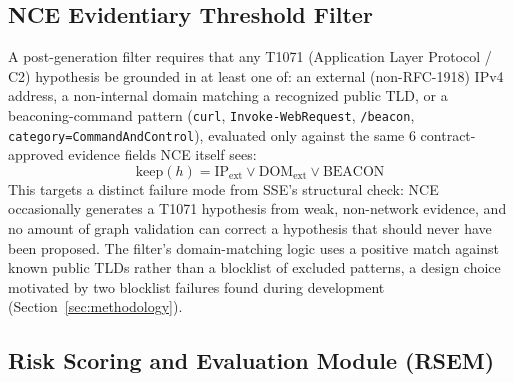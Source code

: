 \documentclass[conference]{IEEEtran}
\begin{document}
\subsection{NCE Evidentiary Threshold Filter}
\label{sec:filter}

A post-generation filter requires that any T1071 (Application Layer Protocol / C2) hypothesis be grounded in at least one of: an external (non-RFC-1918) IPv4 address, a non-internal domain matching a recognized public TLD, or a beaconing-command pattern (\texttt{curl}, \texttt{Invoke-WebRequest}, \texttt{/beacon}, \texttt{category=CommandAndControl}), evaluated only against the same 6 contract-approved evidence fields NCE itself sees:
$$\text{keep}(h) = \text{IP}_{\text{ext}} \lor \text{DOM}_{\text{ext}} \lor \text{BEACON}$$
This targets a distinct failure mode from SSE's structural check: NCE occasionally generates a T1071 hypothesis from weak, non-network evidence, and no amount of graph validation can correct a hypothesis that should never have been proposed. The filter's domain-matching logic uses a positive match against known public TLDs rather than a blocklist of excluded patterns, a design choice motivated by two blocklist failures found during development (Section~\ref{sec:methodology}).

\subsection{Risk Scoring and Evaluation Module (RSEM)}
\label{sec:rsem}
\end{document}
